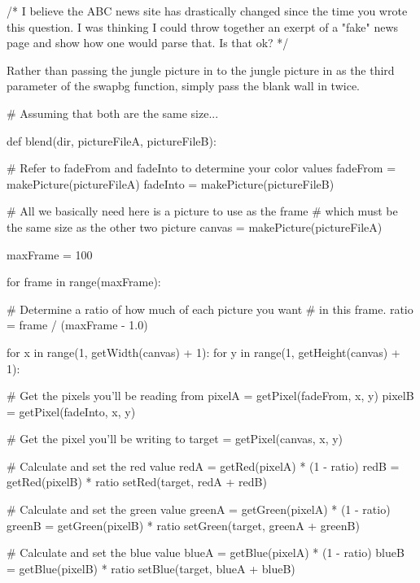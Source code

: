 \begin{exercises}
\begin{ex} %
/* I believe the ABC news site has drastically changed since 
the time you wrote this question. I was thinking I could
throw together an exerpt of a "fake" news page and show
how one would parse that. Is that ok? */
\end{ex}

\begin{ex} %
Rather than passing the jungle picture in to the jungle picture in as the
third parameter of the swapbg function, simply pass the blank wall in
twice.
\end{ex}

\begin{ex} %
\begin{example}
# Assuming that both are the same size...

def blend(dir, pictureFileA, pictureFileB):

  # Refer to fadeFrom and fadeInto to determine your color values
  fadeFrom = makePicture(pictureFileA)
  fadeInto = makePicture(pictureFileB)

  # All we basically need here is a picture to use as the frame
  # which must be the same size as the other two picture
  canvas = makePicture(pictureFileA)

  maxFrame = 100

  for frame in range(maxFrame):

    # Determine a ratio of how much of each picture you want
    # in this frame. 
    ratio = frame / (maxFrame - 1.0)
  
    for x in range(1, getWidth(canvas) + 1):
      for y in range(1, getHeight(canvas) + 1):

        # Get the pixels you'll be reading from
        pixelA = getPixel(fadeFrom, x, y)
        pixelB = getPixel(fadeInto, x, y)

        # Get the pixel you'll be writing to
        target = getPixel(canvas, x, y)

        # Calculate and set the red value
        redA = getRed(pixelA) * (1 - ratio)
        redB = getRed(pixelB) * ratio
        setRed(target, redA + redB)

        # Calculate and set the green value
        greenA = getGreen(pixelA) * (1 - ratio)
        greenB = getGreen(pixelB) * ratio
        setGreen(target, greenA + greenB)

        # Calculate and set the blue value
        blueA = getBlue(pixelA) * (1 - ratio)
        blueB = getBlue(pixelB) * ratio
        setBlue(target, blueA + blueB)


\end{example}
\end{ex}
\end{exercises}
